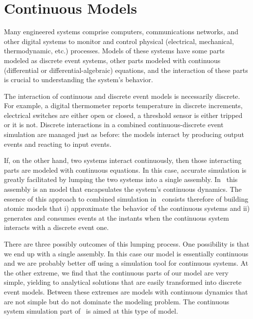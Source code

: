 \chapter{Continuous Models}
Many engineered systems comprise computers, communications networks, and other digital systems to monitor and control physical (electrical, mechanical, thermodynamic, etc.) processes. Models of these systems have some parts modeled as discrete event systems, other parts modeled with continuous (differential or differential-algebraic) equations, and the interaction of these parts is crucial to understanding the system's behavior.

The interaction of continuous and discrete event models is necessarily discrete. For example, a digital thermometer reports temperature in discrete increments, electrical switches are either open or closed, a threshold sensor is either tripped or it is not. Discrete interactions in a combined continuous-discrete event simulation are managed just as before: the models interact by producing output events and reacting to input events.

If, on the other hand, two systems interact continuously, then those interacting parts are modeled with continuous equations. In this case, accurate simulation is greatly facilitated by lumping the two systems into a single assembly. In \adevs\ this assembly is an  model that encapsulates the system's continuous dynamics. The essence of this approach to combined simulation in \adevs\ consists therefore of building atomic models that i) approximate the behavior of the continuous systems and ii) generates and consumes events at the instants when the continuous system interacts with a discrete event one.

There are three possibly outcomes of this lumping process. One possibility is that we end up with a single assembly. In this case our model is essentially continuous and we are probably better off using a simulation tool for continuous systems. At the other extreme, we find that the continuous parts of our model are very simple, yielding to analytical solutions that are easily transformed into discrete event models. Between these extremes are models with continuous dynamics that are not simple but do not dominate the modeling problem. The continuous system simulation part of \adevs\ is aimed at this type of model.

